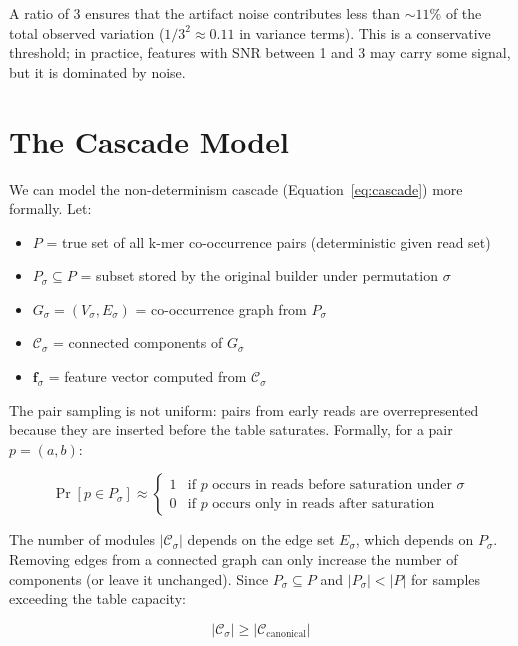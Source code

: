\documentclass{../yalumba}
\begin{document}
A ratio of 3 ensures that the artifact noise contributes less than $\sim 11\%$
of the total observed variation ($1/3^2 \approx 0.11$ in variance terms). This
is a conservative threshold; in practice, features with SNR between 1 and 3 may
carry some signal, but it is dominated by noise.


\section{The Cascade Model}
\label{app:cascade}

We can model the non-determinism cascade (Equation~\ref{eq:cascade}) more
formally. Let:

\begin{itemize}[leftmargin=2em]
  \item $P$ = true set of all k-mer co-occurrence pairs (deterministic given read set)
  \item $P_\sigma \subseteq P$ = subset stored by the original builder under permutation $\sigma$
  \item $G_\sigma = (V_\sigma, E_\sigma)$ = co-occurrence graph from $P_\sigma$
  \item $\mathcal{C}_\sigma$ = connected components of $G_\sigma$
  \item $\mathbf{f}_\sigma$ = feature vector computed from $\mathcal{C}_\sigma$
\end{itemize}

The pair sampling is not uniform: pairs from early reads are overrepresented
because they are inserted before the table saturates. Formally, for a pair
$p = (a, b)$:

\begin{equation}
  \Pr[p \in P_\sigma] \approx
    \begin{cases}
      1 & \text{if } p \text{ occurs in reads before saturation under } \sigma \\
      0 & \text{if } p \text{ occurs only in reads after saturation}
    \end{cases}
\end{equation}

The number of modules $|\mathcal{C}_\sigma|$ depends on the edge set
$E_\sigma$, which depends on $P_\sigma$. Removing edges from a connected
graph can only increase the number of components (or leave it unchanged).
Since $P_\sigma \subseteq P$ and $|P_\sigma| < |P|$ for samples exceeding
the table capacity:

\begin{equation}
  |\mathcal{C}_\sigma| \geq |\mathcal{C}_{\text{canonical}}|
\end{equation}
\end{document}
